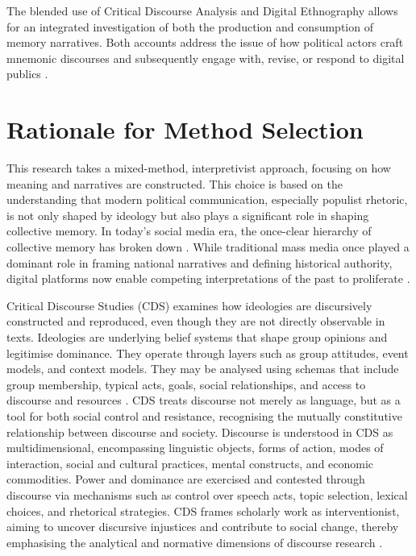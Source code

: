 The blended use of Critical Discourse Analysis and Digital Ethnography allows for an integrated investigation of both the production and consumption of memory narratives. \pagebreak Both accounts address the issue of how political actors craft mnemonic discourses and subsequently engage with, revise, or respond to digital publics \citep{matthes_digital_2017}.

\section{Rationale for Method Selection}

This research takes a mixed-method, interpretivist approach, focusing on how meaning and narratives are constructed. This choice is based on the understanding that modern political communication, especially populist rhetoric, is not only shaped by ideology but also plays a significant role in shaping collective memory. In today's social media era, the once-clear hierarchy of collective memory has broken down \citep{rutten_memory_2014}. While traditional mass media once played a dominant role in framing national narratives and defining historical authority, digital platforms now enable competing interpretations of the past to proliferate \citep{wasilewski_radical-right_2023}.

Critical Discourse Studies (CDS) examines how ideologies are discursively constructed and reproduced, even though they are not directly observable in texts. Ideologies are underlying belief systems that shape group opinions and legitimise dominance. They operate through layers such as group attitudes, event models, and context models. They may be analysed using schemas that include group membership, typical acts, goals, social relationships, and access to discourse and resources \citep{van_dijk_principles_1993}. CDS treats discourse not merely as language, but as a tool for both social control and resistance, recognising the mutually constitutive relationship between discourse and society. Discourse is understood in CDS as multidimensional, encompassing linguistic objects, forms of action, modes of interaction, social and cultural practices, mental constructs, and economic commodities. Power and dominance are exercised and contested through discourse via mechanisms such as control over speech acts, topic selection, lexical choices, and rhetorical strategies. CDS frames scholarly work as interventionist, aiming to uncover discursive injustices and contribute to social change, thereby emphasising the analytical and normative dimensions of discourse research \citep{tannen_critical_2015}.

